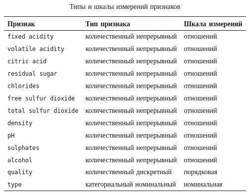 \begin{table}[ht]
    \centering
    \caption{Типы и шкалы измерений признаков}
    \label{tab:scales-wine}
    \scriptsize
    \begin{tabularx}{\textwidth}{LLL}
        \hline
        Признак & Тип признака & Шкала измерений \\
        \hline
        \texttt{fixed acidity} &
        количественный непрерывный &
        отношений \\
 
        \texttt{volatile acidity} &
        количественный непрерывный &
        отношений \\
 
        \texttt{citric acid} &
        количественный непрерывный &
        отношений \\
 
        \texttt{residual sugar} &
        количественный непрерывный &
        отношений \\
        
        \texttt{chlorides} &
        количественный непрерывный &
        отношений \\
        
        \texttt{free sulfur dioxide} &
        количественный непрерывный &
        отношений \\
        
        \texttt{total sulfur dioxide} &
        количественный непрерывный &
        отношений \\
        
        \texttt{density} &
        количественный непрерывный &
        отношений \\
        
        \texttt{pH} &
        количественный непрерывный &
        отношений \\
        
         \texttt{sulphates} &
        количественный непрерывный &
        отношений \\
        
         \texttt{alcohol} &
        количественный непрерывный &
        отношений \\
        
        \texttt{quality} &
        количественный дискретный &
        порядковая \\
 
        \texttt{type} &
        категориальный номинальный &
        номинальная \\
        \hline
    \end{tabularx}
\end{table}
 
